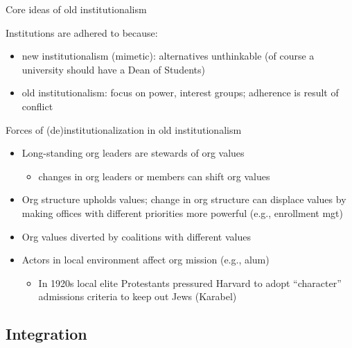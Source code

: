 \begin{frame}{Core ideas of old institutionalism}

	Institutions are adhered to because:
	\begin{itemize}
		\item new institutionalism (mimetic): alternatives unthinkable (of course a university should have a Dean of Students)
		\item old institutionalism: focus on power, interest groups; adherence is result of conflict
	\end{itemize}
	\vspace{2mm}	
	Forces of (de)institutionalization in old institutionalism
	\begin{itemize}
		\item Long-standing org leaders are stewards of org values
		\begin{itemize}
			\item changes in org leaders or members can shift org values
		\end{itemize}
		\item Org structure upholds values; change in org structure can displace values by making offices with different priorities more powerful (e.g., enrollment mgt)
		\item Org values diverted by coalitions with different values
		\item Actors in local environment affect org mission (e.g., alum)
		\begin{itemize}
			\item In 1920s local elite Protestants pressured Harvard to adopt ``character'' admissions criteria to keep out Jews (Karabel)
		\end{itemize}
		
	\end{itemize}

\end{frame}

\subsection{Integration}

